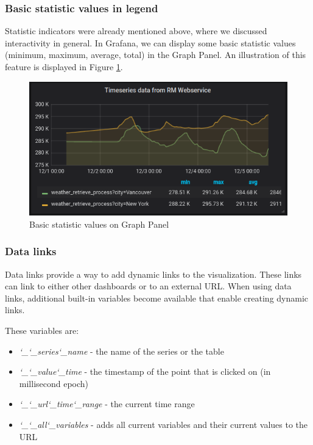 \subsubsection{Basic statistic values in legend}

Statistic indicators were already mentioned above, where we discussed interactivity in general. In Grafana, we can display some basic statistic values (minimum, maximum, average, total) in the Graph Panel. An illustration of this feature is displayed in Figure \ref{fig:basic-statistics}.

\begin{figure}[H]
	\centering
	\includegraphics[width=130mm, keepaspectratio]{figures/basic-statistics.png}
	\caption{Basic statistic values on Graph Panel}
	\label{fig:basic-statistics}
\end{figure}

\subsubsection{Data links}

Data links provide a way to add dynamic links to the visualization. These links can link to either other dashboards or to an external URL. When using data links, additional built-in variables become available that enable creating dynamic links.  \cite{grafana-graph-datalink}

These variables are:
\begin{itemize}
	\item \emph{\char`_\char`_series\char`_name} - the name of the series or the table
	\item \emph{\char`_\char`_value\char`_time} - the timestamp of the point that is clicked on (in millisecond epoch)
	\item \emph{\char`_\char`_url\char`_time\char`_range} - the current time range
	\item \emph{\char`_\char`_all\char`_variables} - adds all current variables and their current values to the URL
\end{itemize}


